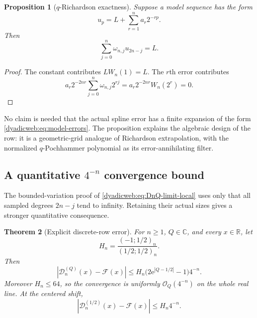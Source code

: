 \documentclass[11pt,oneside]{article}
\newtheorem{theorem}{Theorem}[section]
\newtheorem{proposition}[theorem]{Proposition}
\theoremstyle{definition}
\theoremstyle{remark}
\newcommand{\R}{\mathbb R}
\newcommand{\C}{\mathbb C}
\newcommand{\e}{\mathrm e}
\newcommand{\bigO}{\mathcal O}
\begin{document}
\begin{proposition}[$q$-Richardson exactness]
\label{dyadicweb:prop:q-richardson}
Suppose a model sequence has the form
\begin{equation}
 u_p=L+\sum_{r=1}^{n}a_r2^{-rp}.                           \label{dyadicweb:eq:model-errors}
\end{equation}
Then
\begin{equation}
 \sum_{j=0}^{n}\omega_{n,j}u_{2n-j}=L.                    \label{dyadicweb:eq:q-richardson}
\end{equation}
\end{proposition}

\begin{proof}
The constant contributes $L W_n(1)=L$.  The $r$th error contributes
\[
 a_r2^{-2nr}\sum_{j=0}^{n}\omega_{n,j}2^{rj}
 =a_r2^{-2nr}W_n(2^r)=0.
\]
\end{proof}

No claim is needed that the actual spline error has a finite expansion of the form
\eqref{dyadicweb:eq:model-errors}.  The proposition explains the algebraic design of the row: it is a
geometric-grid analogue of Richardson extrapolation, with the normalized $q$-Pochhammer
polynomial as its error-annihilating filter.

\subsection[A quantitative four-to-the-minus-n convergence bound]{A quantitative $4^{-n}$ convergence bound}

The bounded-variation proof of \eqref{dyadicweb:eq:DnQ-limit-local} uses only that all sampled degrees
$2n-j$ tend to infinity.  Retaining their actual sizes gives a stronger quantitative
consequence.

\begin{theorem}[Explicit discrete-row error]
\label{dyadicweb:thm:D-error}
For $n\ge1$, $Q\in\C$, and every $x\in\R$, let
\begin{equation}
 H_n=\frac{(-1;1/2)_n}{(1/2;1/2)_n}.                      \label{dyadicweb:eq:Hn-def}
\end{equation}
Then
\begin{equation}
 \boxed{
 |\mathcal D_n^{(Q)}(x)-\mathcal F(x)|
 \le H_n\bigl(2\e^{|Q-1/2|}-1\bigr)4^{-n}.}              \label{dyadicweb:eq:D-error}
\end{equation}
Moreover $H_n\le64$, so the convergence is uniformly $\bigO_Q(4^{-n})$ on the whole real
line.  At the centered shift,
\begin{equation}
 |\mathcal D_n^{(1/2)}(x)-\mathcal F(x)|\le H_n4^{-n}.     \label{dyadicweb:eq:D-centered-error}
\end{equation}
\end{theorem}
\end{document}
